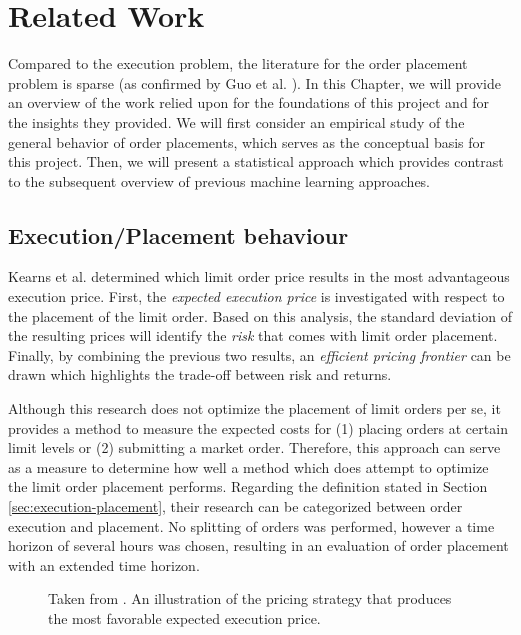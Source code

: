 \chapter{Related Work}
\label{chap:related-work}

Compared to the execution problem, the literature for the order placement problem is sparse (as confirmed by Guo et al. \cite{guo2013optimal}).
In this Chapter, we will provide an overview of the work relied upon for the foundations of this project and for the insights they provided.
We will first consider an empirical study of the general behavior of order placements, which serves as the conceptual basis for this project.
Then, we will present a statistical approach which provides contrast to the subsequent overview of previous machine learning approaches.

\section{Execution/Placement behaviour}
\label{sec:related-execution-behaviour}

Kearns et al. \cite{nevmyvaka2005electronic} determined which limit order price results in the most advantageous execution price.
First, the \textit{expected execution price} is investigated with respect to the placement of the limit order. 
Based on this analysis, the standard deviation of the resulting prices will identify the \textit{risk} that comes with limit order placement. 
Finally, by combining the previous two results, an \textit{efficient pricing frontier} can be drawn which highlights the trade-off between risk and returns.

Although this research does not optimize the placement of limit orders per se, it provides a method to measure the expected costs for (1) placing orders at certain limit levels or (2) submitting a market order.
Therefore, this approach can serve as a measure to determine how well a method which does attempt to optimize the limit order placement performs.
Regarding the definition stated in Section \ref{sec:execution-placement}, their research can be categorized between order execution and placement.
No splitting of orders was performed, however a time horizon of several hours was chosen, resulting in an evaluation of order placement with an extended time horizon.

\begin{figure}[H]
    \centering
    \caption{Taken from \cite{nevmyvaka2005electronic}. An illustration of the pricing strategy that produces the most favorable expected execution price.}
    \label{fig:kearns-return}
\end{figure}

